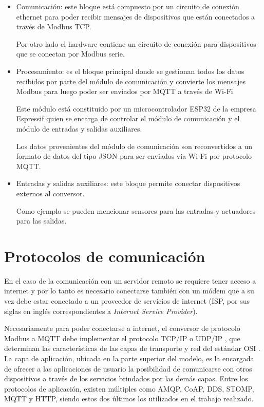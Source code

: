 \begin{itemize}
	\item Comunicación: este bloque está compuesto por un circuito de conexión ethernet para poder recibir mensajes de dispositivos que están conectados a través de Modbus TCP. 
	
	Por otro lado el hardware contiene un circuito de conexión para dispositivos que se conectan por Modbus serie.
	
	\item Procesamiento: es el bloque principal donde se gestionan todos los datos recibidos por parte del módulo de comunicación y  convierte los mensajes Modbus para luego poder ser enviados por MQTT a través de Wi-Fi  
	
	Este módulo está constituido por un microcontrolador ESP32 \citep{WEBSITE:11} de la empresa Espressif \citep{WEBSITE:10} quien se encarga de controlar el módulo de comunicación y el módulo de entradas y salidas auxiliares.
	
	Los datos provenientes del módulo de comunicación son reconvertidos a un formato de datos del tipo JSON \citep{WEBSITE:12} para ser enviados vía Wi-Fi por protocolo MQTT.
	
	
	\item Entradas y salidas auxiliares: este bloque permite conectar dispositivos externos al conversor. 
	
	Como ejemplo se pueden mencionar sensores para las entradas y actuadores para las salidas. 
	
	
\end{itemize}


\section{Protocolos de comunicación}
En el caso de la comunicación con un servidor remoto se requiere tener acceso a internet y por lo tanto es necesario conectarse también con un módem que a
su vez debe estar conectado a un proveedor de servicios de internet (ISP, por sus siglas en inglés correspondientes a \textit{Internet Service Provider}).

Necesariamente para poder conectarse a internet, el conversor de protocolo Modbus a MQTT debe implementar el protocolo TCP/IP \citep{WEBSITE:15} o UDP/IP \citep{WEBSITE:16}, que determinan las características de las capas de transporte y red del estándar OSI \citep{WEBSITE:13}. La capa de aplicación, ubicada en la parte superior del modelo, es la encargada de ofrecer a las aplicaciones de usuario la posibilidad de comunicarse con otros dispositivos a través de los servicios brindados por las demás capas. Entre los protocolos de aplicación, existen múltiples como AMQP, CoAP, DDS, STOMP, MQTT y HTTP, siendo estos dos últimos los utilizados en el trabajo realizado.


